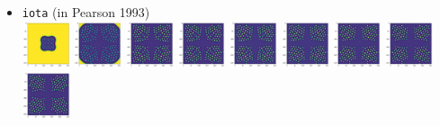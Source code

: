 \begin{itemize}
\item {\tt iota} (in Pearson 1993)\\
\includegraphics[width=1.4cm]{python_codes/fieldstone_171/pearson93/iota_solution_0001000_u}
\includegraphics[width=1.4cm]{python_codes/fieldstone_171/pearson93/iota_solution_0005000_u}
\includegraphics[width=1.4cm]{python_codes/fieldstone_171/pearson93/iota_solution_0010000_u}
\includegraphics[width=1.4cm]{python_codes/fieldstone_171/pearson93/iota_solution_0015000_u}
\includegraphics[width=1.4cm]{python_codes/fieldstone_171/pearson93/iota_solution_0020000_u}
\includegraphics[width=1.4cm]{python_codes/fieldstone_171/pearson93/iota_solution_0030000_u}
\includegraphics[width=1.4cm]{python_codes/fieldstone_171/pearson93/iota_solution_0040000_u}
\includegraphics[width=1.4cm]{python_codes/fieldstone_171/pearson93/iota_solution_0050000_u}
\includegraphics[width=1.4cm]{python_codes/fieldstone_171/pearson93/iota_solution_0075000_u}

\end{itemize}
